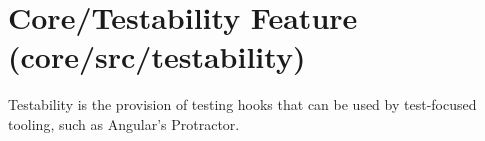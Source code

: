 \section{Core/Testability Feature (core/src/testability)}

Testability is the provision of testing hooks that can be used by test-focused tooling,
such as Angular’s Protractor.








